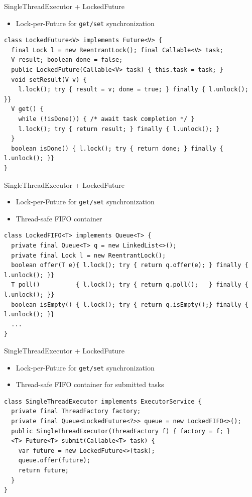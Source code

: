 \begin{frame}{SingleThreadExecutor + LockedFuture}

\begin{itemize}
    \item Lock-per-Future for \texttt{get/set} synchronization
\end{itemize}

\pause
\begin{verbatim}
class LockedFuture<V> implements Future<V> {
  final Lock l = new ReentrantLock(); final Callable<V> task;
  V result; boolean done = false;
  public LockedFuture(Callable<V> task) { this.task = task; }
  void setResult(V v) { 
    l.lock(); try { result = v; done = true; } finally { l.unlock(); }}
  V get() {
    while (!isDone()) { /* await task completion */ }
    l.lock(); try { return result; } finally { l.unlock(); }
  }
  boolean isDone() { l.lock(); try { return done; } finally { l.unlock(); }}
}
\end{verbatim}
\end{frame}


\begin{frame}{SingleThreadExecutor + LockedFuture}

\begin{itemize}
    \item Lock-per-Future for \texttt{get/set} synchronization
    \item Thread-safe FIFO container    
\end{itemize}

\pause
\begin{verbatim}
class LockedFIFO<T> implements Queue<T> {
  private final Queue<T> q = new LinkedList<>();
  private final Lock l = new ReentrantLock();
  boolean offer(T e){ l.lock(); try { return q.offer(e); } finally { l.unlock(); }}
  T poll()          { l.lock(); try { return q.poll();   } finally { l.unlock(); }}
  boolean isEmpty() { l.lock(); try { return q.isEmpty();} finally { l.unlock(); }}
  ...
}
\end{verbatim}
\end{frame}

\begin{frame}{SingleThreadExecutor + LockedFuture}

\begin{itemize}
    \item Lock-per-Future for \texttt{get/set} synchronization
    \item Thread-safe FIFO container for submitted tasks    
\end{itemize}

\pause
\begin{verbatim}
class SingleThreadExecutor implements ExecutorService {
  private final ThreadFactory factory;
  private final Queue<LockedFuture<?>> queue = new LockedFIFO<>();
  public SingleThreadExecutor(ThreadFactory f) { factory = f; }
  <T> Future<T> submit(Callable<T> task) {
    var future = new LockedFuture<>(task);
    queue.offer(future);
    return future;
  }
}
\end{verbatim}
\end{frame}

